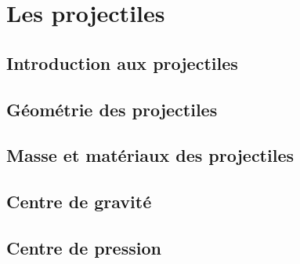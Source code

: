 
\chapter*{}

\cleardoublepage
{}
\renewcommand{\CurrentPartColor}{Part4Color}
\renewcommand{\CurrentPartNumber}{Partie 04}
\renewcommand{\CurrentPartName}{Les projectiles}
\renewcommand{\CurrentChapterType}{Chapitre}


\part{Les projectiles}

    \chapter{Introduction aux projectiles}
    \label{chap:introduction_aux_projectiles}
    

    \chapter{Géométrie des projectiles}
    \label{chap:geometrie_projectiles}
    

    \chapter{Masse et matériaux des projectiles}
    \label{chap:masse_et_materiaux}
    

    \chapter{Centre de gravité}
    \label{chap:centre_gravite}
    

    \chapter{Centre de pression}
    \label{chap:centre_pression}
    

